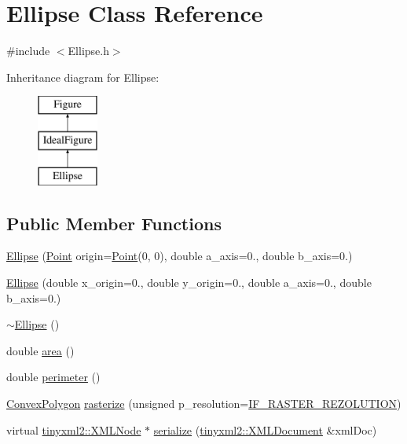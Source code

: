 \hypertarget{class_ellipse}{}\section{Ellipse Class Reference}
\label{class_ellipse}


{\ttfamily \#include $<$Ellipse.\+h$>$}

Inheritance diagram for Ellipse\+:\begin{figure}[H]
\begin{center}
\leavevmode
\includegraphics[height=3.000000cm]{class_ellipse}
\end{center}
\end{figure}
\subsection*{Public Member Functions}
\begin{DoxyCompactItemize}
\item 
\hyperlink{class_ellipse_a8b1d116bc30be65369b4db5b9b1c5f9d}{Ellipse} (\hyperlink{class_point}{Point} origin=\hyperlink{class_point}{Point}(0, 0), double a\+\_\+axis=0., double b\+\_\+axis=0.)
\item 
\hyperlink{class_ellipse_a10da17fc6ffc0ea3590da040b42960e4}{Ellipse} (double x\+\_\+origin=0., double y\+\_\+origin=0., double a\+\_\+axis=0., double b\+\_\+axis=0.)
\item 
\hyperlink{class_ellipse_a94271a8a2b16101a52491b7e81e28547}{$\sim$\+Ellipse} ()
\item 
double \hyperlink{class_ellipse_ad3de2759830df27c4ae1e65ecf46e7a1}{area} ()
\item 
double \hyperlink{class_ellipse_a367ca002c3a95761d0b913f98bc4eb6e}{perimeter} ()
\item 
\hyperlink{class_convex_polygon}{Convex\+Polygon} \hyperlink{class_ellipse_a54a8e6dab13f9d3a0cc633101e2ce6d6}{rasterize} (unsigned p\+\_\+resolution=\hyperlink{_ideal_figure_8h_a00d8c937c01b3a24f12056a00144690b}{I\+F\+\_\+\+R\+A\+S\+T\+E\+R\+\_\+\+R\+E\+Z\+O\+L\+U\+T\+I\+ON})
\item 
virtual \hyperlink{classtinyxml2_1_1_x_m_l_node}{tinyxml2\+::\+X\+M\+L\+Node} $\ast$ \hyperlink{class_ellipse_ab6c64b8c54cb74a4552a5f4f487f8d7d}{serialize} (\hyperlink{classtinyxml2_1_1_x_m_l_document}{tinyxml2\+::\+X\+M\+L\+Document} \&xml\+Doc)
\end{DoxyCompactItemize}
